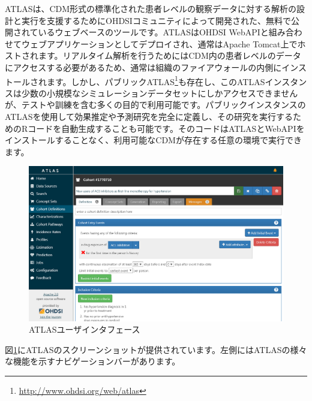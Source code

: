 \documentclass[
  11pt]{book}
\theoremstyle{definition}
\theoremstyle{definition}
\theoremstyle{definition}
\theoremstyle{definition}
\theoremstyle{remark}
\begin{document}
ATLASは、CDM形式の標準化された患者レベルの観察データに対する解析の設計と実行を支援するためにOHDSIコミュニティによって開発された、無料で公開されているウェブベースのツールです。ATLASはOHDSI WebAPIと組み合わせてウェブアプリケーションとしてデプロイされ、通常はApache Tomcat上でホストされます。リアルタイム解析を行うためにはCDM内の患者レベルのデータにアクセスする必要があるため、通常は組織のファイアウォールの内側にインストールされます。しかし、パブリックATLAS\footnote{\url{http://www.ohdsi.org/web/atlas}}も存在し、このATLASインスタンスは少数の小規模なシミュレーションデータセットにしかアクセスできませんが、テストや訓練を含む多くの目的で利用可能です。パブリックインスタンスのATLASを使用して効果推定や予測研究を完全に定義し、その研究を実行するためのRコードを自動生成することも可能です。そのコードはATLASとWebAPIをインストールすることなく、利用可能なCDMが存在する任意の環境で実行できます。

\begin{figure}

{\centering \includegraphics[width=1\linewidth]{images/OhdsiAnalyticsTools/atlas} 

}

\caption{ATLASユーザインタフェース}\label{fig:atlas}
\end{figure}

図\ref{fig:atlas}にATLASのスクリーンショットが提供されています。左側にはATLASの様々な機能を示すナビゲーションバーがあります。
\end{document}
